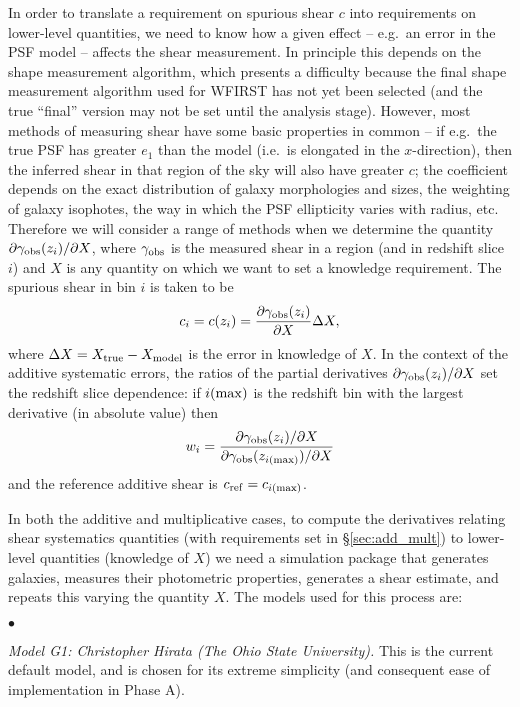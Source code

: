 In order to translate a requirement on spurious shear $c$ into requirements on lower-level quantities, we need to know how a given effect -- e.g.\ an error in the PSF model -- affects the shear measurement. In principle this depends on the shape measurement algorithm, which presents a difficulty because the final shape measurement algorithm used for WFIRST has not yet been selected (and the true ``final'' version may not be set until the analysis stage). However, most methods of measuring shear have some basic properties in common -- if e.g.\ the true PSF has greater $e_1$ than the model (i.e.\ is elongated in the $x$-direction), then the inferred shear in that region of the sky will also have greater $c$; the coefficient depends on the exact distribution of galaxy morphologies and sizes, the weighting of galaxy isophotes, the way in which the PSF ellipticity varies with radius, etc. Therefore we will consider a range of methods when we determine the quantity $\partial\gamma_{\rm obs}(z_i)/\partial X$, where $\gamma_{\rm obs}$ is the measured shear in a region (and in redshift slice $i$) and $X$ is any quantity on which we want to set a knowledge requirement. The spurious shear in bin $i$ is taken to be 
\begin{equation}
c_i = c(z_i) = \frac{\partial\gamma_{\rm obs}(z_i)}{\partial X} \Delta X,
\label{eq:X-shape}
\end{equation}
where $\Delta X = X_{\rm true} - X_{\rm model}$ is the error in knowledge of $X$. In the context of the additive systematic errors, the ratios of the partial derivatives $\partial\gamma_{\rm obs}(z_i)/\partial X$ set the redshift slice dependence: if $i({\rm max})$ is the redshift bin with the largest derivative (in absolute value) then
\begin{equation}
w_i = \frac{\partial\gamma_{\rm obs}(z_i)/\partial X}{\partial\gamma_{\rm obs}(z_{i({\rm max})})/\partial X}
\end{equation}
and the reference additive shear is $c_{\rm ref} = c_{i({\rm max})}$.


In both the additive and multiplicative cases, to compute the derivatives relating shear systematics quantities (with requirements set in \S\ref{sec:add_mult}) to lower-level quantities (knowledge of $X$) we need a simulation package that generates galaxies, measures their photometric properties, generates a shear estimate, and repeats this varying the quantity $X$. The models used for this process are:
\begin{list}{$\bullet$}{}
\item {\em Model G1: Christopher Hirata (The Ohio State University).} This is the current default model, and is chosen for its extreme simplicity (and consequent ease of implementation in Phase A).
\end{list}

